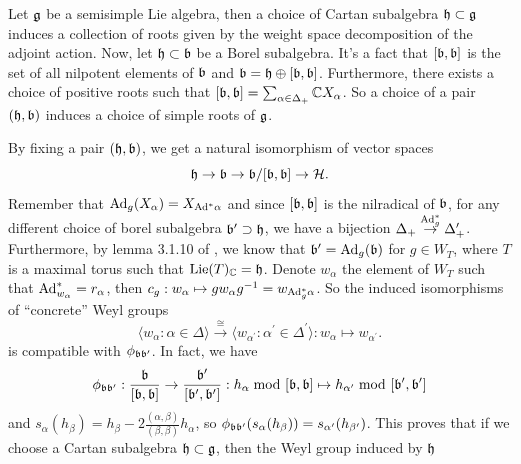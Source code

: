 \begin{remark}
    Let $\mathfrak{g}$ be a semisimple Lie algebra, then a choice of Cartan subalgebra $\mathfrak{h}\subset\mathfrak{g}$ induces 
    a collection of roots given by the weight space decomposition of the adjoint action. Now, let 
    $\mathfrak{h}\subset\mathfrak{b}$ be a Borel subalgebra. It's a fact that $[\mathfrak{b},\mathfrak{b}]$ is the set of 
    all nilpotent elements of $\mathfrak{b}$ and $\mathfrak{b}=\mathfrak{h}\oplus[\mathfrak{b},\mathfrak{b}]$. Furthermore, there exists 
    a choice of positive roots such that $[\mathfrak{b},\mathfrak{b}]=\sum_{\alpha\in\Delta_+}\mathbb{C} X_\alpha$. So a choice of a pair 
    $(\mathfrak{h},\mathfrak{b})$ induces a choice of simple roots of $\mathfrak{g}$.
\end{remark}

By fixing a pair $(\mathfrak{h},\mathfrak{b})$, we get a natural isomorphism of vector spaces 
\begin{equation}
    \mathfrak{h}\to \mathfrak{b}\to \mathfrak{b}/[\mathfrak{b},\mathfrak{b}]\to\mathcal{H}.
\end{equation}
Remember that $\text{Ad}_g(X_\alpha)=X_{\text{Ad}^*\alpha}$ and since $[\mathfrak{b},\mathfrak{b}]$ is the nilradical of $\mathfrak{b}$, for any 
different choice of borel subalgebra $\mathfrak{b}^\prime\supset\mathfrak{h}$, we have a bijection 
$\Delta_+\overset{\text{Ad}^*_g}{\rightarrow}\Delta_+^\prime$. Furthermore, by lemma 3.1.10 of \cite{chriss1997representation}, 
we know that $\mathfrak{b}^\prime = \text{Ad}_g(\mathfrak{b})$ for $g\in W_T$, where $T$ is a maximal torus such that 
$\text{Lie}(T)_{\mathbb{C}}=\mathfrak{h}$. Denote $w_\alpha$ the element of $W_T$ such that $\text{Ad}_{w_\alpha}^*=r_\alpha$, then 
$c_g:w_\alpha\mapsto gw_\alpha g^{-1}=w_{\text{Ad}_g^*\alpha}$. So the induced isomorphisms of ``concrete'' Weyl groups 
\begin{equation}
    \langle w_\alpha: \alpha\in\Delta\rangle \overset{\cong}{\to} 
    \langle w_{\alpha^\prime}:\alpha^\prime\in\Delta^\prime\rangle:w_{\alpha}\mapsto w_{\alpha^\prime}. 
\end{equation} 
is compatible with $\phi_{\mathfrak{b}\mathfrak{b}^\prime}$. In fact, we have 
\begin{equation}
    \phi_{\mathfrak{b}\mathfrak{b}^\prime}: \frac{\mathfrak{b}}{[\mathfrak{b},\mathfrak{b}]}\to\frac{\mathfrak{b}^\prime}{[\mathfrak{b}^\prime,\mathfrak{b}^\prime]}: 
    h_\alpha\;\text{mod }[\mathfrak{b},\mathfrak{b}]\mapsto h_{\alpha^\prime}\;\text{mod }[\mathfrak{b}^\prime,\mathfrak{b}^\prime]
\end{equation}
and $s_\alpha(h_\beta)=h_\beta-2\tfrac{(\alpha,\beta)}{(\beta,\beta)}h_\alpha$, so 
$\phi_{\mathfrak{b}\mathfrak{b}^\prime}(s_\alpha(h_\beta))=s_{\alpha^\prime}(h_{\beta^\prime})$. This proves that 
if we choose a Cartan subalgebra $\mathfrak{h}\subset\mathfrak{g}$, then the Weyl group induced by $\mathfrak{h}$ 
